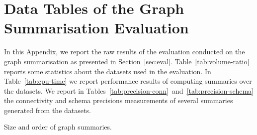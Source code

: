 \chapter{Data Tables of the Graph Summarisation Evaluation}

In this Appendix, we report the raw results of the evaluation conducted on the graph summarisation as presented in Section~\ref{sec:eval}. Table~\ref{tab:volume-ratio} reports some statistics about the datasets used in the evaluation. In Table~\ref{tab:cpu-time} we report performance results of computing summaries over the datasets. We report in Tables~\ref{tab:precision-conn}~and~\ref{tab:precision-schema} the \gls{connectivity} and \gls{schema} precisions measurements of several summaries generated from the datasets.

\begin{table}
	\centering
	\resizebox{\textwidth}{!}{
		
	}
	\caption{Size and order of graph summaries.}
	\label{tab:volume-ratio}
\end{table}

\begin{table}
	\centering
	\resizebox{\textwidth}{!}{
		
	}
	\caption[Computational performance of graph summaries creation]{Performance comparison. We report the CPU time in $ms$ of the \emph{edges} step in the graph summarisation computation. For each category of dataset complexity, we report the mean $\mu$ of the CPU time.%
	}
	\label{tab:cpu-time}
\end{table}






